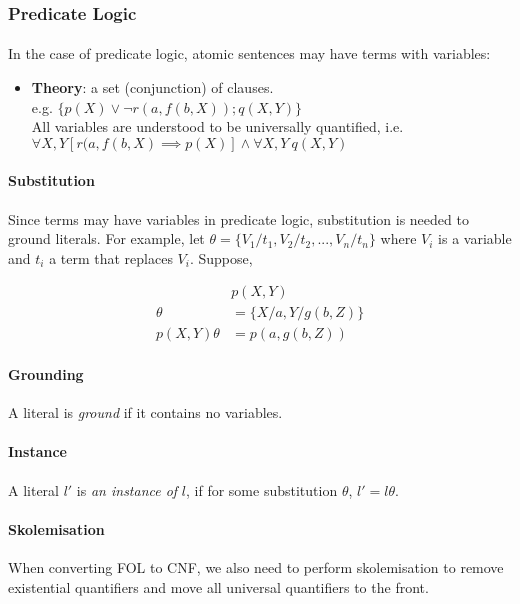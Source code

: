 \documentclass{article}
\theoremstyle{plain}
\theoremstyle{definition}
\begin{document}
\begin{multicols}{2}
\subsubsection{Predicate Logic}

\paragraph {} In the case of predicate logic, atomic sentences may have terms with variables:

\begin{itemize}
\item \textbf{Theory}: a set (conjunction) of clauses.\\ e.g. $\{p(X) \lor \lnot r(a, f(b, X)); q(X, Y)\}$\\ All variables are understood to be universally quantified, i.e.\\ $\forall X, Y [r(a, f(b, X) \implies p(X)] \land \forall X, Y\ q(X, Y)$
\end{itemize}

\paragraph{Substitution} Since terms may have variables in predicate logic, substitution is needed to ground literals. For example, let $\theta = \{V_1/t_1, V_2/t_2, ..., V_n/t_n\}$ where $V_i$ is a variable and $t_i$ a term that replaces $V_i$. Suppose, 

\begin{align*}
&p(X, Y)\\
\theta &= \{X/a, Y/g(b, Z)\}\\
p(X, Y)\theta &= p(a, g(b, Z))
\end{align*}

\paragraph{Grounding} A literal is \textit{ground} if it contains no variables.

\paragraph{Instance} A literal $l'$ is \textit{an instance of} $l$, if for some substitution $\theta$, $l' = l\theta$.

\paragraph{Skolemisation} When converting FOL to CNF, we also need to perform skolemisation to remove existential quantifiers and move all universal quantifiers to the front. 


\end{multicols}
\end{document}
